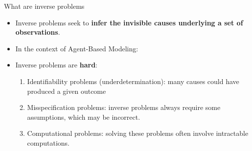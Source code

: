 \documentclass[10pt]{beamer}
\begin{document}
\begin{frame}{What are inverse problems}
    \begin{itemize}
        \item<1-> Inverse problems seek to \textbf{infer the invisible causes underlying a set of observations}.
        \item<2-> In the context of Agent-Based Modeling:
    \end{itemize}

    \begin{figure}
        \centering
    \end{figure}

    \begin{itemize}
        \item<4-> Inverse problems are \textbf{hard}:
        \begin{enumerate}
            \item<5-> Identifiability problems (underdetermination): many causes could have produced a given outcome
            \item<6-> Misspecification problems: inverse problems always require some assumptions, which may be incorrect.
            \item<7-> Computational problems: solving these problems often involve intractable computations.
        \end{enumerate}
    \end{itemize}
\end{frame}
\end{document}
